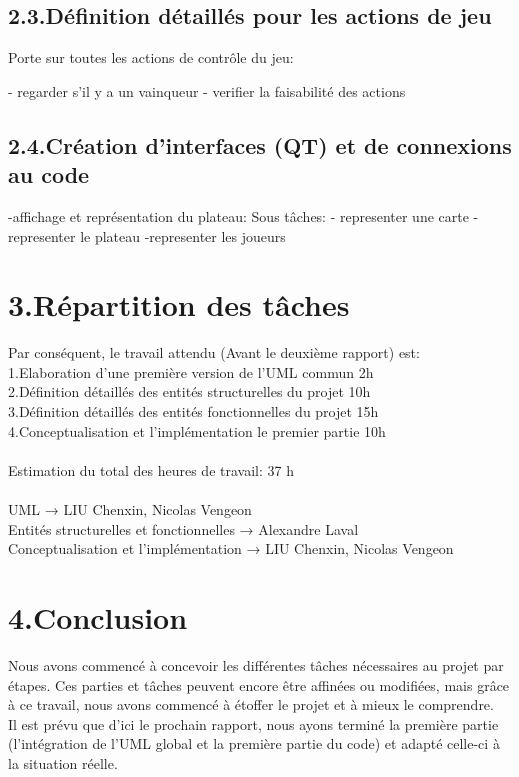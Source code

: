 \documentclass[a4paper]{article}
\begin{document}
\subsection*{2.3.Définition détaillés pour les actions de jeu}

Porte sur toutes les actions de contrôle du jeu:

- regarder s’il y a un vainqueur
- verifier la faisabilité des actions

\subsection*{2.4.Création d'interfaces (QT) et de connexions au code}
-affichage et représentation  du plateau:
 Sous tâches:
 - representer une carte
 - representer le plateau
 -representer les joueurs



\section*{3.Répartition des tâches}
Par conséquent, le travail attendu (Avant le deuxième rapport) est:\\
1.Elaboration d'une première version de l'UML commun 2h\\
2.Définition détaillés des entités structurelles du projet 10h\\
3.Définition détaillés des entités fonctionnelles du projet 15h\\
4.Conceptualisation et l’implémentation le premier partie 10h\\
\\
Estimation du total des heures de travail: 37 h\\
\\
UML → LIU Chenxin, Nicolas Vengeon\\
Entités structurelles et fonctionnelles → Alexandre Laval\\
Conceptualisation et l’implémentation → LIU Chenxin, Nicolas Vengeon\\

\section*{4.Conclusion}
Nous avons commencé à concevoir les différentes tâches nécessaires au projet par étapes. Ces parties et tâches peuvent encore être affinées ou modifiées, mais grâce à ce travail, nous avons commencé à étoffer le projet et à mieux le comprendre.\\
 Il est prévu que d'ici le prochain rapport, nous ayons terminé la première partie (l'intégration de l'UML global et la première partie du code) et adapté celle-ci à la situation réelle.





\end{document}
